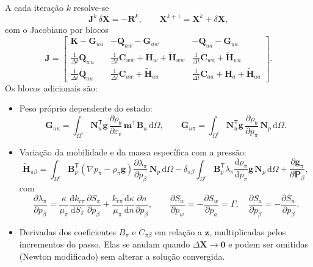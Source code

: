 \documentclass[11pt,a4paper]{article}
\newcommand{\dd}{\mathrm{d}}
\begin{document}
A cada iteração $k$ resolve-se
\begin{equation*}
\boxed{\mathbf J^{k}\,\delta\mathbf X=-\mathbf R^{k},\qquad
\mathbf X^{k+1}=\mathbf X^{k}+\delta\mathbf X,}
\end{equation*}
com o Jacobiano por blocos
\begin{equation*}
\boxed{\mathbf J=\begin{bmatrix}
\mathbf K-\mathbf G_{uu}&-\mathbf Q_{uw}-\mathbf G_{uw}&-\mathbf Q_{ua}-\mathbf G_{ua}\\[3pt]
\tfrac{1}{\Delta t}\mathbf Q_{wu}&\tfrac{1}{\Delta t}\mathbf C_{ww}+\mathbf H_w+\tilde{\mathbf H}_{ww}&\tfrac{1}{\Delta t}\mathbf C_{wa}+\tilde{\mathbf H}_{wa}\\[3pt]
\tfrac{1}{\Delta t}\mathbf Q_{au}&\tfrac{1}{\Delta t}\mathbf C_{aw}+\tilde{\mathbf H}_{aw}&\tfrac{1}{\Delta t}\mathbf C_{aa}+\mathbf H_a+\tilde{\mathbf H}_{aa}
\end{bmatrix}.}
\end{equation*}
Os blocos adicionais são:
\begin{itemize}
\item Peso próprio dependente do estado:
\begin{equation*}
\mathbf G_{uu}=\int_{\Omega^e}\mathbf N_u^{\mathsf T}\mathbf g\,
\frac{\partial\rho_b}{\partial\varepsilon_v}\,\mathbf m^{\mathsf T}\mathbf B_u\,\dd\Omega,\qquad
\mathbf G_{u\pi}=\int_{\Omega^e}\mathbf N_u^{\mathsf T}\mathbf g\,
\frac{\partial\rho_b}{\partial p_\pi}\,\mathbf N_p\,\dd\Omega .
\end{equation*}
\item Variação da mobilidade e da massa específica com a pressão:
\begin{equation*}
\tilde{\mathbf H}_{\pi\beta}=\int_{\Omega^e}\mathbf B_p^{\mathsf T}
\left(\nabla p_\pi-\rho_\pi\mathbf g\right)\frac{\partial\lambda_\pi}{\partial p_\beta}\,\mathbf N_p\,\dd\Omega
-\delta_{\pi\beta}\int_{\Omega^e}\mathbf B_p^{\mathsf T}\lambda_\pi\frac{\dd\rho_\pi}{\dd p_\pi}\mathbf g\,\mathbf N_p\,\dd\Omega
+\frac{\partial\mathbf g_\pi}{\partial\mathbf P_\beta},
\end{equation*}
com
\begin{equation*}
\frac{\partial\lambda_\pi}{\partial p_\beta}
=\frac{\kappa}{\mu_\pi}\frac{\dd k_{r\pi}}{\dd S_\pi}\frac{\partial S_\pi}{\partial p_\beta}
+\frac{k_{r\pi}}{\mu_\pi}\frac{\dd\kappa}{\dd n}\frac{\partial n}{\partial p_\beta},
\qquad
\frac{\partial S_w}{\partial p_w}=-\frac{\partial S_w}{\partial p_a}=\Gamma,\quad
\frac{\partial S_a}{\partial p_\beta}=-\frac{\partial S_w}{\partial p_\beta}.
\end{equation*}
\item Derivadas dos coeficientes $B_\pi$ e $C_{\pi\beta}$ em relação a
$\mathbf z$, multiplicadas pelos incrementos do passo. Elas se anulam
quando $\Delta\mathbf X\to\mathbf 0$ e podem ser omitidas
(Newton modificado) sem alterar a solução convergida.
\end{itemize}
\end{document}
